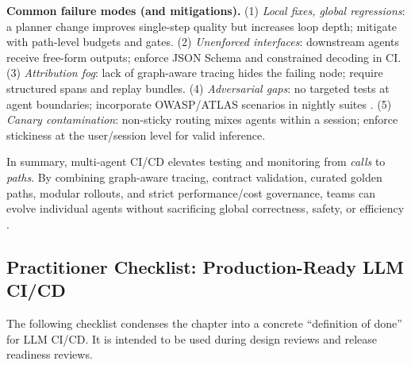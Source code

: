 \noindent\textbf{Common failure modes (and mitigations).}
(1) \emph{Local fixes, global regressions}: a planner change improves single-step quality but increases loop depth; mitigate with path-level budgets and gates.  
(2) \emph{Unenforced interfaces}: downstream agents receive free-form outputs; enforce JSON Schema and constrained decoding in CI.  
(3) \emph{Attribution fog}: lack of graph-aware tracing hides the failing node; require structured spans and replay bundles.  
(4) \emph{Adversarial gaps}: no targeted tests at agent boundaries; incorporate OWASP/ATLAS scenarios in nightly suites \cite{owasp_llm}.  
(5) \emph{Canary contamination}: non-sticky routing mixes agents within a session; enforce stickiness at the user/session level for valid inference.

\medskip
In summary, multi-agent CI/CD elevates testing and monitoring from \emph{calls} to \emph{paths}. By combining graph-aware tracing, contract validation, curated golden paths, modular rollouts, and strict performance/cost governance, teams can evolve individual agents without sacrificing global correctness, safety, or efficiency \cite{phoenix_rag,trulens,owasp_llm}.


\subsection{Practitioner Checklist: Production-Ready LLM CI/CD}
\label{sec:cicd-checklist}
The following checklist condenses the chapter into a concrete ``definition of done'' for LLM CI/CD. It is intended to be used during design reviews and release readiness reviews.

